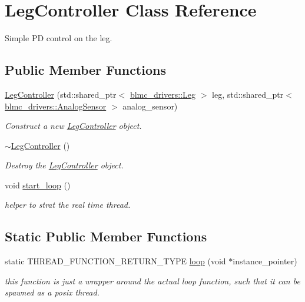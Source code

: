 \hypertarget{classLegController}{}\section{Leg\+Controller Class Reference}
\label{classLegController}


Simple PD control on the leg.  


\subsection*{Public Member Functions}
\begin{DoxyCompactItemize}
\item 
\hyperlink{classLegController_a9d1253c4c70fe6b83e449830c7328b58}{Leg\+Controller} (std\+::shared\+\_\+ptr$<$ \hyperlink{classblmc__drivers_1_1Leg}{blmc\+\_\+drivers\+::\+Leg} $>$ leg, std\+::shared\+\_\+ptr$<$ \hyperlink{classblmc__drivers_1_1AnalogSensor}{blmc\+\_\+drivers\+::\+Analog\+Sensor} $>$ analog\+\_\+sensor)
\begin{DoxyCompactList}\small\item\em Construct a new \hyperlink{classLegController}{Leg\+Controller} object. \end{DoxyCompactList}\item 
\mbox{\label{classLegController_ad7f3068767ed754bbefd1744463764d0}} 
\hyperlink{classLegController_ad7f3068767ed754bbefd1744463764d0}{$\sim$\+Leg\+Controller} ()
\begin{DoxyCompactList}\small\item\em Destroy the \hyperlink{classLegController}{Leg\+Controller} object. \end{DoxyCompactList}\item 
\mbox{\label{classLegController_adacfe6a1709021da8cd7009672d01440}} 
void \hyperlink{classLegController_adacfe6a1709021da8cd7009672d01440}{start\+\_\+loop} ()
\begin{DoxyCompactList}\small\item\em helper to strat the real time thread. \end{DoxyCompactList}\end{DoxyCompactItemize}
\subsection*{Static Public Member Functions}
\begin{DoxyCompactItemize}
\item 
\mbox{\label{classLegController_a87bba6942e6f8ba649f595e871d0d379}} 
static T\+H\+R\+E\+A\+D\+\_\+\+F\+U\+N\+C\+T\+I\+O\+N\+\_\+\+R\+E\+T\+U\+R\+N\+\_\+\+T\+Y\+PE \hyperlink{classLegController_a87bba6942e6f8ba649f595e871d0d379}{loop} (void $\ast$instance\+\_\+pointer)
\begin{DoxyCompactList}\small\item\em this function is just a wrapper around the actual loop function, such that it can be spawned as a posix thread. \end{DoxyCompactList}\end{DoxyCompactItemize}
